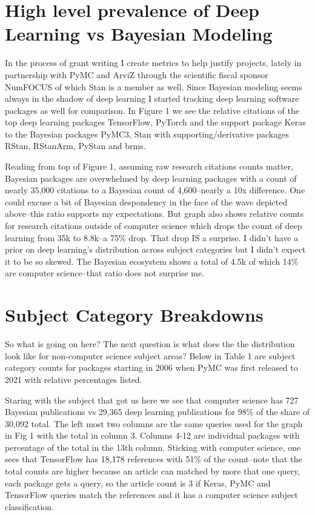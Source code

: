 \documentclass[AMA,STIX1COL]{WileyNJD-v2}
\begin{document}
\section{High level prevalence of Deep Learning vs Bayesian Modeling}

In the process of grant writing I create metrics to help justify projects, lately in partnership with PyMC and ArviZ through the scientific fiscal sponsor NumFOCUS of which Stan is a member as well. Since Bayesian modeling seems always in the shadow of deep learning I started tracking deep learning software packages as well for comparison. In Figure 1 we see the relative citations of the top deep learning packages TensorFlow, PyTorch and the support package Keras to the Bayesian packages PyMC3, Stan with supporting/derivative packages RStan, RStanArm, PyStan and brms. 

Reading from top of Figure 1, assuming raw research citations counts matter, Bayesian packages are overwhelmed by deep learning packages with a count of nearly 35,000 citations to a Bayesian count of 4,600--nearly a 10x difference. One could excuse a bit of Bayesian despondency in the face of the wave depicted above--this ratio supports my expectations. But graph also shows relative counts for research citations outside of computer science which drops the count of deep learning from 35k to 8.8k--a 75\% drop. That drop IS a surprise.  I didn't have a prior on deep learning's distribution across subject categories but I didn't expect it to be so skewed. The Bayesian ecosystem shows a total of 4.5k of which 14\% are computer science--that ratio does not surprise me. 

\section{Subject Category Breakdowns}

So what is going on here? The next question is what does the the distribution look like for non-computer science subject areas?  Below in Table 1 are subject category counts for packages starting in 2006 when PyMC was first released to 2021 with relative percentages listed. 

Staring with the subject that got us here we see that computer science has 727 Bayesian publications vs 29,365 deep learning publications for 98\% of the share of 30,092 total. The left most two columns are the same queries used for the graph in Fig 1 with the total in column 3. Columns 4-12 are individual packages with percentage of the total in the 13th column.  Sticking with computer science, one sees that TensorFlow has 18,178 references with 51\% of the count--note that the total counts are higher because an article can matched by more that one query, each package gets a query, so the article count is 3 if Keras, PyMC and TensorFlow queries match the references and it has a computer science subject classification. 
\end{document}
